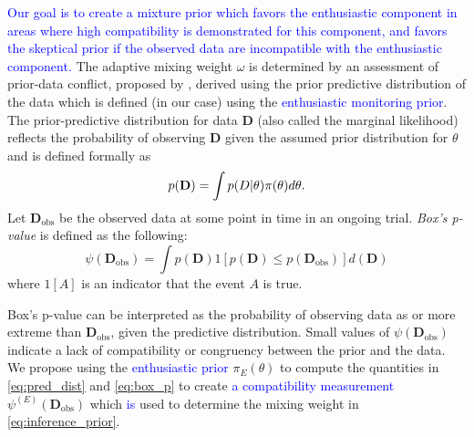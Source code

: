 \documentclass[AMA,STIX1COL,doublespace]{WileyNJD-v2}
\begin{document}
\textcolor{blue}{Our goal is to create a mixture prior which favors the enthusiastic component in areas where high compatibility is demonstrated for this component, and favors the skeptical prior if the observed data are incompatible with the enthusiastic component.} The adaptive mixing weight $\omega$ is determined by an assessment of prior-data conflict, proposed by \cite{Box1980}, derived using the prior predictive distribution of 
the data which is defined (in our case) using the \textcolor{blue}{enthusiastic monitoring prior}.
The prior-predictive distribution for data $\mathbf{D}$ (also called the marginal likelihood) reflects the probability of observing $\mathbf{D}$ given 
the assumed prior distribution for $\theta$ and is defined formally as
\begin{equation}\label{eq:pred_dist}
p(\mathbf{D}) =\int p(\boldmath{D}|\theta)\pi(\theta)d\theta.
\end{equation}
Let $\mathbf{D}_{\text{obs}}$ be the observed data at some point in time in an ongoing trial. 
\textit{Box's p-value} is defined as the following:
\begin{equation}\label{eq:box_p}
\psi({\mathbf{D}_{\text{obs}}})=\int {p(\mathbf{D})}  1[p(\mathbf{D})\leq p(\mathbf{D}_{\text{obs}})] d(\mathbf{D})
\end{equation}
%
where $1[A]$ is an indicator that the event $A$ is true.

Box's p-value can be interpreted as the probability of observing data as or more extreme than $\mathbf{D}_{\text{obs}}$, given the predictive distribution. 
%
Small values of $\psi({\mathbf{D}_{\text{obs}}})$ indicate a lack of compatibility or congruency between the prior and the data. 
%
We propose using the \textcolor{blue}{enthusiastic prior} $\pi_E(\theta)$ to compute the quantities in \eqref{eq:pred_dist} and \eqref{eq:box_p} to create \textcolor{blue}{a compatibility measurement} $\psi^{(E)}(\mathbf{D}_{\text{obs}})$ which \textcolor{blue}{is} used to determine the mixing weight in \eqref{eq:inference_prior}. 
\end{document}
